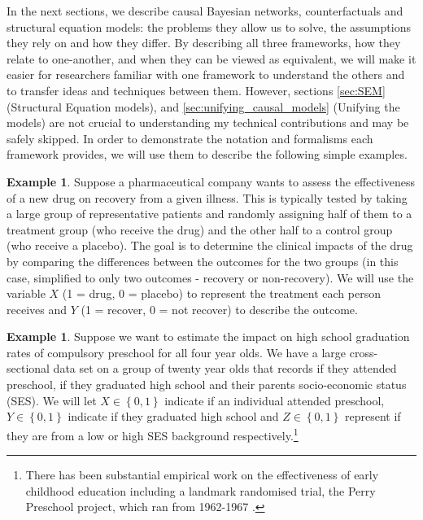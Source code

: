 \documentclass[11pt,a4paper,twoside]{report}
\newcommand{\set}[1]{\left\{#1\right\}}
\theoremstyle{plain}
\theoremstyle{definition}
\newtheorem{example}[theorem]{Example}
\begin{document}
In the next sections, we describe causal Bayesian networks, counterfactuals and structural equation models: the problems they allow us to solve, the assumptions they rely on and how they differ. By describing all three frameworks, how they relate to one-another, and when they can be viewed as equivalent, we will make it easier for researchers familiar with one framework to understand the others and to transfer ideas and techniques between them. However, sections \ref{sec:SEM} (Structural Equation models), and \ref{sec:unifying_causal_models} (Unifying the models) are not crucial to understanding my technical contributions and may be safely skipped. In order to demonstrate the notation and formalisms each framework provides, we will use them to describe the following simple examples. 

\vspace*{.3cm}
\begin{example}
\label{exm:ranomized_experiment}
Suppose a pharmaceutical company wants to assess the effectiveness of a new drug on recovery from a given illness. This is typically tested by taking a large group of representative patients and randomly assigning half of them to a treatment group (who receive the drug) and the other half to a control group (who receive a placebo). The goal is to determine the clinical impacts of the drug by comparing the differences between the outcomes for the two groups (in this case, simplified to only two outcomes - recovery or non-recovery). We will use the variable $X$ (1 = drug, 0 = placebo) to represent the treatment each person receives and $Y$ (1 = recover, 0 = not recover) to describe the outcome. 
\end{example}

\vspace*{.3cm}
\begin{example}
\label{exm:adjusting}
Suppose we want to estimate the impact on high school graduation rates of compulsory preschool for all four year olds. We have a large cross-sectional data set on a group of twenty year olds that records if they attended preschool, if they graduated high school and their parents socio-economic status (SES). We will let $X\in \set{0,1}$ indicate if an individual attended preschool, $Y \in \set{0,1}$ indicate if they graduated high school and $Z \in \set{0,1}$ represent if they are from a low or high SES background respectively.\footnote{There has been substantial empirical work on the effectiveness of early childhood education including a landmark randomised trial, the Perry Preschool project, which ran from 1962-1967 \citep{weikart1970longitudinal}.}
\end{example}
\end{document}
